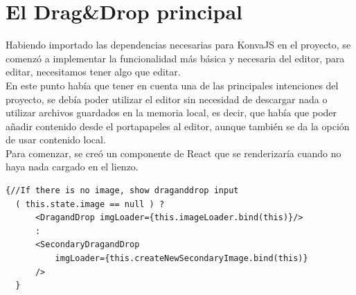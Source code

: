 \section{El Drag\&Drop principal}
Habiendo importado las dependencias necesarias para KonvaJS\cite{KonvaJS} en el proyecto,
se comenzó a implementar la funcionalidad más básica y necesaria del editor, para editar,
necesitamos tener algo que editar. 
\\
En este punto había que tener en cuenta una de las principales intenciones del proyecto,
se debía poder utilizar el editor sin necesidad de descargar nada o utilizar archivos
guardados en la memoria local, es decir, que había que poder añadir contenido desde 
el portapapeles al editor, aunque también se da la opción de usar contenido local.
\\
Para comenzar, se creó un componente de React que se renderizaría cuando no haya 
nada cargado en el lienzo.

\begin{lstlisting}[caption={Renderizado condicional del componente del DragandDrop}]
  {//If there is no image, show draganddrop input
  ( this.state.image == null ) ?
      <DragandDrop imgLoader={this.imageLoader.bind(this)}/> 
      : 
      <SecondaryDragandDrop 
          imgLoader={this.createNewSecondaryImage.bind(this)}
      />
  }
\end{lstlisting}

